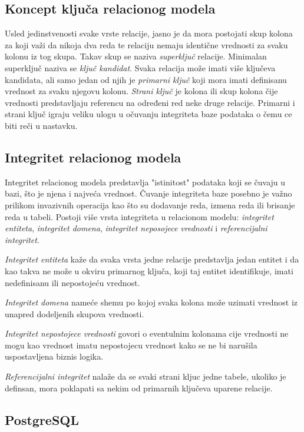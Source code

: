 \documentclass[12pt,oneside]{memoir}
\begin{document}
\subsection{Koncept ključa relacionog modela}

Usled jedinstvenosti svake vrste relacije, jasno je da mora postojati skup kolona za koji važi da nikoja dva reda te relaciju nemaju identične vrednosti za svaku kolonu iz tog skupa. Takav skup se naziva \textit{superključ} relacije. Minimalan superključ naziva se \textit{ključ kandidat}. Svaka relacija može imati više ključeva kandidata, ali samo jedan od njih je  \textit{primarni ključ} koji mora imati definisanu vrednost za svaku njegovu kolonu.
\textit{Strani ključ} je kolona ili skup kolona čije vrednosti predstavljaju referencu na određeni red neke druge relacije. Primarni i strani ključ igraju veliku ulogu u očuvanju integriteta baze podataka o čemu ce biti reči u nastavku.

\subsection{Integritet relacionog modela}
Integritet relacionog modela predstavlja "istinitost"  podataka koji se čuvaju u bazi, što je njena i najveća vrednost. Čuvanje integriteta baze posebno je važno  prilikom invazivnih operacija kao što su dodavanje reda, izmena reda ili brisanje reda u tabeli. Postoji više vrsta integriteta u relacionom modelu: \textit{integritet entiteta}, \textit{integritet domena}, \textit{integritet neposojece vrednosti} i \textit{referencijalni integritet}.

 \textit{Integritet entiteta} kaže da svaka vrsta jedne relacije predstavlja jedan entitet i da kao takva ne može u okviru primarnog ključa, koji taj entitet identifikuje, imati nedefinisanu ili nepostojeću vrednost.

\textit{Integritet domena} nameće shemu po kojoj svaka kolona može uzimati vrednost iz unapred dodeljenih skupova vrednosti. 

\textit{Integritet nepostojece vrednosti} govori o eventulnim kolonama cije vrednosti ne mogu kao vrednost imatu nepostojecu vrednost kako se ne bi narušila uspostavljena biznis logika. 

\textit{Referencijalni integritet} nalaže da se svaki strani kljuc jedne tabele, ukoliko je definsan,  mora poklapati sa nekim od primarnih ključeva uparene relacije.

\subsection{PostgreSQL}
\end{document}
